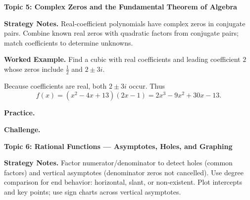 \documentclass[12pt]{exam}
\begin{document}
\begin{questions}
\newpage

\question
\textbf{Topic 5: Complex Zeros and the Fundamental Theorem of Algebra}

\textbf{Strategy Notes.} Real-coefficient polynomials have complex zeros in conjugate pairs. Combine known real zeros with quadratic factors from conjugate pairs; match coefficients to determine unknowns.

\textbf{Worked Example.} Find a cubic with real coefficients and leading coefficient $2$ whose zeros include $\tfrac{1}{2}$ and $2\pm3i$.

Because coefficients are real, both $2\pm3i$ occur. Thus
\[f(x)=(x^2-4x+13)(2x-1)=2x^3-9x^2+30x-13.\]

\vspace{0.2cm}
\textbf{Practice.}

\textbf{Challenge.}

\newpage

\question
\textbf{Topic 6: Rational Functions --- Asymptotes, Holes, and Graphing}

\textbf{Strategy Notes.} Factor numerator/denominator to detect holes (common factors) and vertical asymptotes (denominator zeros not cancelled). Use degree comparison for end behavior: horizontal, slant, or non-existent. Plot intercepts and key points; use sign charts across vertical asymptotes.


\end{questions}
\end{document}
